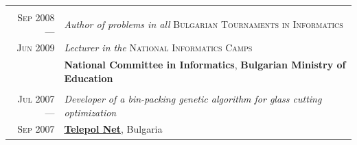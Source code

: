 \documentclass[a4paper,10pt]{article}
\def\myline{\color{linegray}\vline}
\newcommand{\minorcolor}[1]{\textcolor{mygray}{#1}}
\begin{document}
{\begin{tabular}{r!{\myline}p{14cm}}
	\\
	\textsc{Sep 2008 ---}     &  \textit{Author of problems in all} \textsc{Bulgarian Tournaments in Informatics}\\
	\textsc{Jun 2009}        &  \textit{Lecturer in the} \textsc{National Informatics Camps}\\
                                  &  \textbf{National Committee in Informatics}, \textbf{Bulgarian Ministry of Education}\\

	\\
	\textsc{Jul 2007 ---}     &  \textit{Developer of a bin-packing genetic algorithm for glass cutting optimization}\\
	\textsc{Sep 2007}        &  \textbf{\href{http://telepol.net/telepol.net/}{Telepol Net}}, Bulgaria\\
	
\end{tabular}


}
\end{document}

